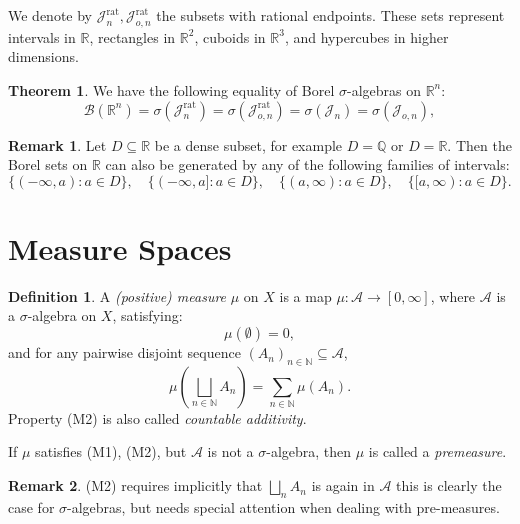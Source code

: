 \documentclass{article}
\theoremstyle{definition}
\newtheorem{definition}{Definition}[section]
\newtheorem{theorem}{Theorem}[section]
\newtheorem{remark}{Remark}[section]
\begin{document}
We denote by $\mathcal{J}_n^{\mathrm{rat}}, \mathcal{J}_{o,n}^{\mathrm{rat}}$ the subsets with rational endpoints. These sets represent intervals in $\mathbb{R}$, rectangles in $\mathbb{R}^2$, cuboids in $\mathbb{R}^3$, and hypercubes in higher dimensions.

\begin{theorem}
We have the following equality of Borel $\sigma$-algebras on $\mathbb{R}^n$:
\[
\mathcal{B}(\mathbb{R}^n) = \sigma(\mathcal{J}_n^{\mathrm{rat}}) = \sigma(\mathcal{J}_{o,n}^{\mathrm{rat}}) = \sigma(\mathcal{J}_n) = \sigma(\mathcal{J}_{o,n}),
\]
\end{theorem}


\medskip
\begin{remark}
Let \(D \subseteq \mathbb{R}\) be a dense subset, for example \(D = \mathbb{Q}\) or \(D = \mathbb{R}\). 
Then the Borel sets on \(\mathbb{R}\) can also be generated by any of the following families of intervals:
\[
\{(-\infty, a) : a \in D\}, \quad \{(-\infty, a] : a \in D\}, \quad \{(a, \infty) : a \in D\}, \quad \{[a, \infty) : a \in D\}.
\]
\end{remark}



\vspace{3em}
\section{Measure Spaces}

\begin{definition}
A \textit{(positive) measure} \(\mu\) on \(X\) is a map \(\mu : \mathcal{A} \to [0, \infty]\), where \(\mathcal{A}\) is a \(\sigma\)-algebra on \(X\), satisfying:
\[
\mu(\emptyset) = 0, \tag{M1}
\]
and for any pairwise disjoint sequence \((A_n)_{n \in \mathbb{N}} \subseteq \mathcal{A}\),
\[
\mu\left( \bigsqcup_{n \in \mathbb{N}} A_n \right) = \sum_{n \in \mathbb{N}} \mu(A_n). \tag{M2}
\]
Property (M2) is also called \emph{countable additivity}.

If \(\mu\) satisfies (M1), (M2), but \(\mathcal{A}\) is not a \(\sigma\)-algebra, then \(\mu\) is called a \textit{premeasure}.
\end{definition}

\medskip
\begin{remark}
(M2) requires implicitly that \(\bigsqcup_{n} A_n\) is again in \(\mathcal{A}\) this is clearly the case for \(\sigma\)-algebras, but needs special attention when dealing with pre-measures.
\end{remark}
\end{document}
